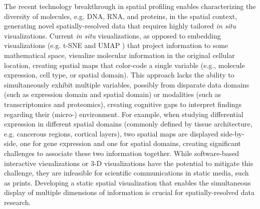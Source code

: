 \documentclass[11pt]{article}
\begin{document}
The recent technology breakthrough in spatial profiling enables characterizing the diversity of molecules, e.g. DNA, RNA, and proteins, in the spatial context\cite{moffitt_2022}, generating novel spatially-resolved data that requires highly tailored \textit{in situ} visualizations\cite{dries_2021, Lewis_2021, odonoghue_2021}. Current \textit{in situ} visualizations, as opposed to embedding visualizations (e.g. t-SNE \cite{hinton_2002} and UMAP \cite{becht_2019}) that project information to some mathematical space, visualize molecular information in the original cellular location, creating spatial maps that color-code a single variable (e.g., molecule expression, cell type, or spatial domain). This approach lacks the ability to simultaneously exhibit multiple variables, possibly from disparate data domains (such as expression domain and spatial domain) or modalities (such as transcriptomics and proteomics), creating cognitive gaps to interpret findings regarding their (micro-) environment. For example, when studying differential expression in different spatial domains (commonly defined by tissue architecture, e.g. cancerous regions, cortical layers), two spatial maps are displayed side-by-side, one for gene expression and one for spatial domains, creating significant challenges to associate these two information together. While software-based interactive visualizations\cite{sriworarat_2023} or 3-D visualizations have the potential to mitigate this challenge, they are infeasible for scientific communications in static media, such as prints. Developing a static spatial visualization that enables the simultaneous display of multiple dimensions of information is crucial for spatially-resolved data research.


\end{document}
